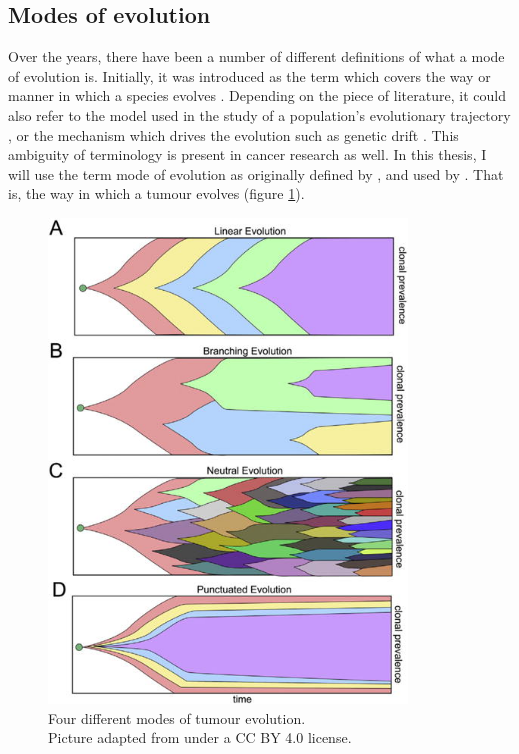 \subsection{Modes of evolution}
Over the years, there have been a number of different definitions of what a mode
of evolution is. Initially, it was introduced as the term which covers the way
or manner in which a species evolves \cite{eiseley_tempo_1945}. Depending on the
piece of literature, it could also refer to the model used in the study of a
population's evolutionary trajectory \cite{yotoko_does_2011}, or the mechanism
which drives the evolution such as genetic drift \cite{glassman_cancer_1996,
wolf_genome_2013}. This ambiguity of terminology is present in cancer research
as well. In this thesis, I will use the term mode of evolution as originally
defined by \cite{eiseley_tempo_1945}, and used by \cite{davis_tumor_2017,
noble_spatial_2022}. That is, the way in which a tumour evolves (figure
\ref{fig:modes}).

\begin{figure}[h!]
    \centering
    \includegraphics[width=0.85\textwidth]{Chapter_3/figures/modes.jpeg}
    \caption{Four different modes of tumour evolution. \\ Picture adapted from
    \cite{davis_tumor_2017} under a CC BY 4.0 license.}
    \label{fig:modes}
\end{figure}

